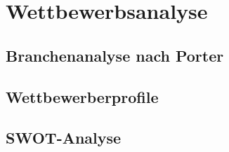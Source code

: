 \chapter{Wettbewerbsanalyse}\label{chap:wettbewerb}

\section{Branchenanalyse nach Porter}\label{sec:porter}

\section{Wettbewerberprofile}\label{sec:profile}

\section{SWOT-Analyse}\label{sec:swot}
